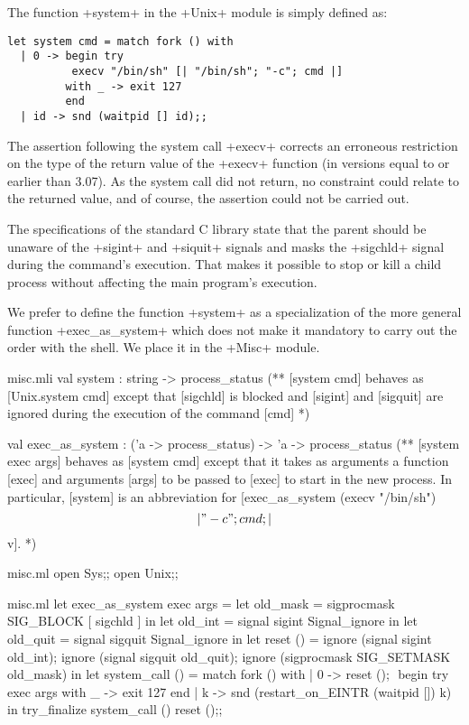 \begin{example}
The function \ml+system+ in the \ml+Unix+ module is simply defined as: 

\begin{lstlisting}
let system cmd = match fork () with
  | 0 -> begin try
          execv "/bin/sh" [| "/bin/sh"; "-c"; cmd |]
         with _ -> exit 127 
         end
  | id -> snd (waitpid [] id);;
\end{lstlisting}

The assertion following the system call \ml+execv+ corrects an
erroneous restriction on the type of the return value of the
\ml+execv+ function (in versions equal to or earlier than 3.07).
As the system call did not return, no constraint could relate to the
returned value, and of course, the assertion could not be
carried out.

The specifications of the standard C library state that the parent
should be unaware of the \ml+sigint+ and \ml+siquit+ signals and masks
the \ml+sigchld+ signal during the command's execution.  
That makes it possible to stop or kill a child process without
affecting the main program's execution.

We prefer to define the function \ml+system+ as a specialization of the
more general function \ml+exec_as_system+ which does not make it
mandatory to carry out the order with the shell. We place it in the
\ml+Misc+ module.

%
\begin{codefile}{misc.mli}
val system : string -> process_status
(** [system cmd] behaves as [Unix.system cmd] except that [sigchld] is
blocked and [sigint] and [sigquit] are ignored during the execution 
of the command [cmd] *)

val exec_as_system : ('a -> process_status) -> 'a -> process_status
(** [system exec args] behaves as [system cmd] except that it takes as
arguments a function [exec] and arguments [args] to be passed to [exec]
to start in the new process. In particular, [system] is an abbreviation for 
[exec_as_system (execv "/bin/sh") \[|"-c"; cmd; |\] v]. *)
\end{codefile}
%
\begin{codefile}{misc.ml}
open Sys;;
open Unix;;
\end{codefile}
%
\begin{listingcodefile}[style=numbers]{misc.ml}
let exec_as_system exec args = 
  let old_mask = sigprocmask SIG_BLOCK [ sigchld ] in 
  let old_int = signal sigint Signal_ignore in 
  let old_quit = signal sigquit Signal_ignore in 
  let reset () =
    ignore (signal sigint old_int); 
    ignore (signal sigquit old_quit);
    ignore (sigprocmask SIG_SETMASK old_mask) in
  let system_call () = 
    match fork () with
    | 0 -> 
        reset (); $\label{prog:sreset}$
        begin try 
          exec args 
        with _ -> exit 127 
        end
    | k -> 
        snd (restart_on_EINTR (waitpid []) k) in
  try_finalize system_call () reset ();; $\label{prog:stry}$


\end{listingcodefile}
\end{example}

